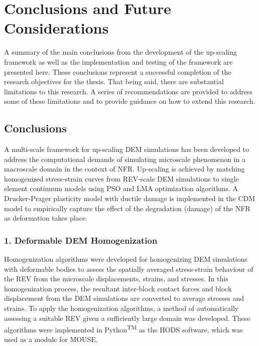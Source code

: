 \chapter{Conclusions and Future Considerations}

A summary of the main conclusions from the development of the up-scaling framework as well as the implementation and testing of the framework are presented here. These conclusions represent a successful completion of the research objectives for the thesis. That being said, there are substantial limitations to this research. A series of recommendations are provided to address some of these limitations and to provide guidance on how to extend this research.

\section{Conclusions}
A multi-scale framework for up-scaling DEM simulations has been developed to address the computational demands of simulating microscale phenomenon in a macroscale domain in the context of NFR. Up-scaling is achieved by matching homogenized stress-strain curves from REV-scale DEM simulations to single element continuum models using PSO and LMA optimization algorithms. A Drucker-Prager plasticity model with ductile damage is implemented in the CDM model to empirically capture the effect of the degradation (damage) of the NFR as deformation takes place.

\subsection*{1. Deformable DEM Homogenization}

Homogenization algorithms were developed for homogenizing DEM simulations with deformable bodies to assess the spatially averaged stress-strain behaviour of the REV from the microscale displacements, strains, and stresses. In this homogenization process, the resultant inter-block contact forces and block displacement from the DEM simulations are converted to average stresses and strains. To apply the homogenization algorithms, a method of automatically assessing a suitable REV given a sufficiently large domain was developed. These algorithms were implemented in Python\textsuperscript{TM} as the HODS software, which was used as a module for MOUSE.

